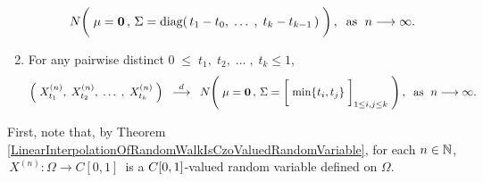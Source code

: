 \begin{theorem}
\begin{enumerate}
\begin{equation*}
		N\!\left(\;
		\mathbf{\mu} = \mathbf{0}\,,\,
		\overset{{\color{white}1}}{\Sigma} = \diag\!\left(\,t_{1}-t_{0},\; \ldots\; ,\; t_{k}-t_{k-1}\,\right)
		\;\right),
		\;\;
		\textnormal{as \;$n \longrightarrow \infty$}.
		\end{equation*}
\item	For any pairwise distinct \;$0 \;\leq\; t_{1},\; t_{2}, \;\ldots\;,\; t_{k} \leq 1$,
		\begin{equation*}
		\left(\;X^{(n)}_{t_{1}},\; X^{(n)}_{t_{2}}, \;\ldots\;,\; X^{(n)}_{t_{k}}\;\right)
		\;\; \overset{d}{\longrightarrow} \;\;
		N\!\left(\;
		\mathbf{\mu} = \mathbf{0}\,,\,
		\Sigma = \left[\;\min\{\overset{{\color{white}1}}{t}_{i},t_{j}\}\;\right]_{1\leq i,j\leq k}
		\;\right),
		\;\;\textnormal{as \;$n \longrightarrow \infty$}.
		\end{equation*}
\end{enumerate}
\end{theorem}
\proof
First, note that, by
Theorem \ref{LinearInterpolationOfRandomWalkIsCzoValuedRandomVariable},
for each $n \in \mathbb{N}$,
\,$X^{(n)} : \Omega \longrightarrow C[0,1]$\,
is a $C[0,1]$-valued random variable defined on $\Omega$.
